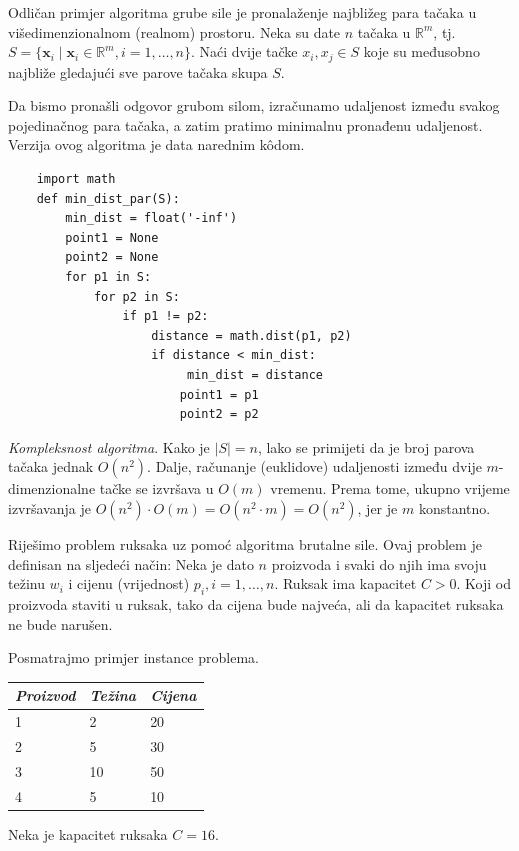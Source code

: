 \begin{example}
	Odličan primjer algoritma grube sile je pronalaženje najbližeg para tačaka u višedimenzionalnom (realnom) prostoru. Neka su date $n$ tačaka u $\mathbb{R}^m$, tj. $S=\{ \textbf{x}_i \mid \textbf{x}_i \in  \mathbb{R}^m, i=1, \ldots, n\}$. Naći dvije tačke $x_i, x_j \in S$ koje su međusobno najbliže gledajući sve parove tačaka skupa $S$.
\end{example}
\begin{solution}
    Da bismo pronašli odgovor grubom silom,  izračunamo udaljenost između svakog pojedinačnog para tačaka, a zatim pratimo minimalnu pronađenu udaljenost. Verzija ovog algoritma je data narednim k\^odom.
   
\footnotesize{
\begin{verbatim}
	import math 
	def min_dist_par(S):
		min_dist = float('-inf')
		point1 = None	
		point2 = None
		for p1 in S:
			for p2 in S:
				if p1 != p2:
					distance = math.dist(p1, p2)
					if distance < min_dist:
					     min_dist = distance
    			 		point1 = p1
    			 		point2 = p2
\end{verbatim}}
\end{solution}

\textit{Kompleksnost algoritma}. Kako je $|S| = n$, lako se primijeti da je broj parova tačaka jednak $O(n^2)$. Dalje, računanje (euklidove) udaljenosti između dvije $m$-dimenzionalne tačke se izvršava u $O(m)$ vremenu. Prema tome, ukupno vrijeme izvršavanja je $O(n^2)\cdot O(m) = O(n^2\cdot m) = O(n^2)$, jer je $m$ konstantno.

\begin{example}
	Riješimo problem ruksaka uz pomoć algoritma brutalne sile. Ovaj problem je definisan na sljedeći način: Neka je dato $n$ proizvoda i svaki do njih ima svoju težinu $w_i$ i cijenu (vrijednost) $p_i, i=1,\ldots, n$. Ruksak ima kapacitet $C>0$. Koji od proizvoda staviti u ruksak, tako da cijena bude najveća, ali da   kapacitet ruksaka ne bude narušen. 
\end{example}

\begin{solution}
	Posmatrajmo primjer instance problema.
\begin{center}	
	\begin{tabular}{lll}
		\emph{Proizvod} & \emph{Težina} & \emph{Cijena} \\ \hline
		1        &  2	& 20 \\
		2		& 	5	& 30 \\
		3		& 10	& 50 \\
		4		&  5 	& 10 \\ \hline
	\end{tabular}
\end{center}
Neka je kapacitet ruksaka $C=16$.


\end{solution}


